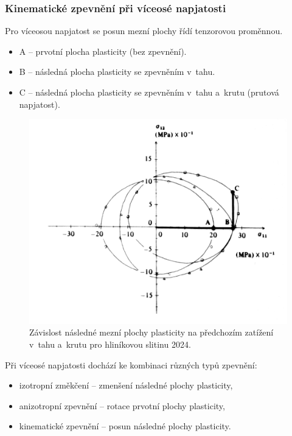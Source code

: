 \subsubsection{Kinematické zpevnění při víceosé napjatosti}
Pro víceosou napjatost se posun mezní plochy řídí tenzorovou proměnnou.
\begin{itemize}
	\item A -- prvotní plocha plasticity (bez zpevnění).
	\item B -- následná plocha plasticity se zpevněním v~tahu.
	\item C -- následná plocha plasticity se zpevněním v~tahu a~krutu (prutová napjatost).
\end{itemize}

\begin{figure}[H]
	\centering
	\includegraphics[width=0.7\linewidth]{Obrazky/zavislost-nasledne-mezni-plochy}
	\caption{Závislost následné mezní plochy plasticity na předchozím zatížení v~tahu a~krutu pro hliníkovou slitinu 2024.}
	\label{fig:zavislost-nasledne-mezni-plochy}
\end{figure}

Při víceosé napjatosti dochází ke kombinaci různých typů zpevnění:
\begin{itemize}
	\item izotropní změkčení -- zmenšení následné plochy plasticity,
	\item anizotropní zpevnění -- rotace prvotní plochy plasticity,
	\item kinematické zpevnění -- posun následné plochy plasticity.
\end{itemize}

